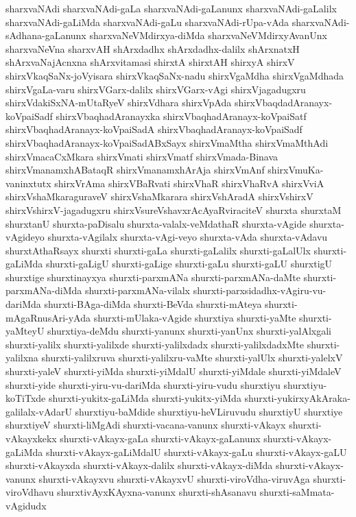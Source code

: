 {sharxvaNAdi
sharxvaNAdi-gaLa
sharxvaNAdi-gaLanunx
sharxvaNAdi-gaLalilx
sharxvaNAdi-gaLiMda
sharxvaNAdi-gaLu
sharxvaNAdi-rUpa-vAda
sharxvaNAdi-sAdhana-gaLanunx
sharxvaNeVMdirxya-diMda
sharxvaNeVMdirxyAvanUnx
sharxvaNeVna
sharxvAH
shArxdadhx
shArxdadhx-dalilx
shArxnatxH
shArxvaNajAcnxna
shArxvitamasi
shirxtA
shirxtAH
shirxyA
shirxV
shirxVkaqSaNx-joVyisara
shirxVkaqSaNx-nadu
shirxVgaMdha
shirxVgaMdhada
shirxVgaLa-varu
shirxVGarx-dalilx
shirxVGarx-vAgi
shirxVjagadugxru
shirxVdakiSxNA-mUtaRyeV
shirxVdhara
shirxVpAda
shirxVbaqdadAranayx-koVpaiSadf
shirxVbaqhadAranayxka
shirxVbaqhadAranayx-koVpaiSatf
shirxVbaqhadAranayx-koVpaiSadA
shirxVbaqhadAranayx-koVpaiSadf
shirxVbaqhadAranayx-koVpaiSadABxSayx
shirxVmaMtha
shirxVmaMthAdi
shirxVmacaCxMkara
shirxVmati
shirxVmatf
shirxVmada-Binava
shirxVmanamxhABataqR
shirxVmanamxhArAja
shirxVmAnf
shirxVmuKa-vaninxtutx
shirxVrAma
shirxVBaRvati
shirxVhaR
shirxVhaRvA
shirxVviA
shirxVshaMkaraguraveV
shirxVshaMkarara
shirxVshAradA
shirxVshirxV
shirxVshirxV-jagadugxru
shirxVsureVshavxrAcAyaRviraciteV
shurxta
shurxtaM
shurxtanU
shurxta-paDisalu
shurxta-valalx-veMdathaR
shurxta-vAgide
shurxta-vAgideyo
shurxta-vAgilalx
shurxta-vAgi-veyo
shurxta-vAda
shurxta-vAdavu
shurxtAthaRsayx
shurxti
shurxti-gaLa
shurxti-gaLalilx
shurxti-gaLalUlx
shurxti-gaLiMda
shurxti-gaLigU
shurxti-gaLige
shurxti-gaLu
shurxti-gaLU
shurxtigU
shurxtige
shurxtinayxya
shurxti-parxmANa
shurxti-parxmANa-daMte
shurxti-parxmANa-diMda
shurxti-parxmANa-vilalx
shurxti-parxsidadhx-vAgiru-vu-dariMda
shurxti-BAga-diMda
shurxti-BeVda
shurxti-mAteya
shurxti-mAgaRnusAri-yAda
shurxti-mUlaka-vAgide
shurxtiya
shurxti-yaMte
shurxti-yaMteyU
shurxtiya-deMdu
shurxti-yanunx
shurxti-yanUnx
shurxti-yalAlxgali
shurxti-yalilx
shurxti-yalilxde
shurxti-yalilxdadx
shurxti-yalilxdadxMte
shurxti-yalilxna
shurxti-yalilxruva
shurxti-yalilxru-vaMte
shurxti-yalUlx
shurxti-yalelxV
shurxti-yaleV
shurxti-yiMda
shurxti-yiMdalU
shurxti-yiMdale
shurxti-yiMdaleV
shurxti-yide
shurxti-yiru-vu-dariMda
shurxti-yiru-vudu
shurxtiyu
shurxtiyu-koTiTxde
shurxti-yukitx-gaLiMda
shurxti-yukitx-yiMda
shurxti-yukirxyAkAraka-galilalx-vAdarU
shurxtiyu-baMdide
shurxtiyu-heVLiruvudu
shurxtiyU
shurxtiye
shurxtiyeV
shurxti-liMgAdi
shurxti-vacana-vanunx
shurxti-vAkayx
shurxti-vAkayxkekx
shurxti-vAkayx-gaLa
shurxti-vAkayx-gaLanunx
shurxti-vAkayx-gaLiMda
shurxti-vAkayx-gaLiMdalU
shurxti-vAkayx-gaLu
shurxti-vAkayx-gaLU
shurxti-vAkayxda
shurxti-vAkayx-dalilx
shurxti-vAkayx-diMda
shurxti-vAkayx-vanunx
shurxti-vAkayxvu
shurxti-vAkayxvU
shurxti-viroVdha-viruvAga
shurxti-viroVdhavu
shurxtivAyxKAyxna-vanunx
shurxti-shAsanavu
shurxti-saMmata-vAgidudx
}
